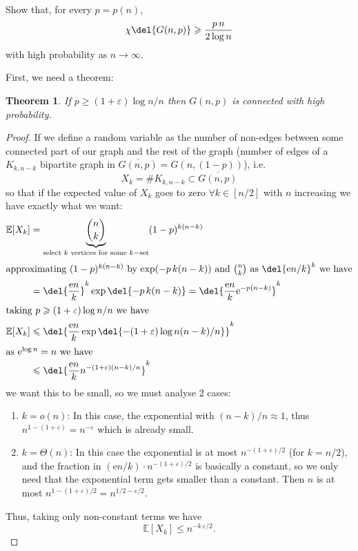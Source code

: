 \documentclass[english]{IMTexam}
\newtheorem{theorem}{Theorem}
\begin{document}
\begin{questions}
		\question Show that, for every $ p = p(n) $,
		\[ \chi\del{G(n,p)}\geqslant \dfrac{p\,n}{2\log n} \]
		with high probability as $ n\to\infty $.
		
		\begin{solution}
			First, we need a theorem:
			
			\begin{theorem}
				If $ p\geqslant (1+\varepsilon)\log n/n $ then $ G(n,p) $ is connected with high probability.
			\end{theorem}
		
			\begin{proof}
				If we define a random variable as the number of non-edges between some connected part of our graph and the rest of the graph (number of edges of a $ K_{k,n-k} $ bipartite graph in $ \overline{G(n,p)}=G(n,(1-p)) $), i.e.
				\[ X_k=\# K_{k,n-k}\subset \overline{G(n,p)} \]
				so that if the expected value of $ X_k $ goes to zero $ \forall k\in[n/2] $ with $ n $ increasing we have exactly what we want:
				\begin{align*}
					\mathbb{E}[X_k]&=\underbrace{\binom{n}{k}}_{\text{select $ k $ vertices for some $ k- $set}}(1-p)^{k(n-k)}\\
					\intertext{approximating $ (1-p)^{k(n-k)} $ by $ \exp(-p\,k(n-k)) $ and $ \binom{n}{k} $ as $ \del{\mathrm{e}n/k}^{k} $ we have}
					&=\del{\dfrac{\mathrm{e}n}{k}}^{k}\exp\del{-p\,k(n-k)}=\del{\dfrac{\mathrm{e}n}{k}\mathrm{e}^{-p(n-k)}}^{k}\\
					\intertext{taking $ p\geqslant (1+\varepsilon)\log n/n $ we have}
					\mathbb{E}[X_k]&\leqslant\del{\dfrac{\mathrm{e}n}{k}\exp\del{-(1+\varepsilon)\log n(n-k)/n}}^{k}\\
					\intertext{as $ \mathrm{e}^{\log n}=n $ we have}
					&\leqslant\del{\dfrac{\mathrm{e}n}{k}n^{-(1+\varepsilon)(n-k)/n}}^{k}
				\end{align*}
				we want this to be small, so we must analyse $ 2 $ cases:
					\begin{enumerate}
						\item $ k=o(n) $:
						In this case, the exponential with $ (n-k)/n\approx 1 $, thus $ n^{1-(1+\varepsilon)}=n^{-\varepsilon} $ which is already small.
						\item $ k=\Theta(n) $:
						In this case the exponential is at most $ n^{-(1+\varepsilon)/2} $ (for $ k=n/2 $), and the fraction in $ (\mathrm{e}n/k)\cdot n^{-(1+\varepsilon)/2} $ is basically a constant, so we only need that the exponential term gets smaller than a constant. Then $ n $ is at most $ n^{1-(1+\varepsilon)/2}=n^{1/2-\varepsilon/2} $.
					\end{enumerate}
				Thus, taking only non-constant terms we have
				\[ \mathbb{E}[X_k]\leqslant n^{-k\,\varepsilon/2}. \]
				

\end{proof}
\end{solution}
\end{questions}
\end{document}
